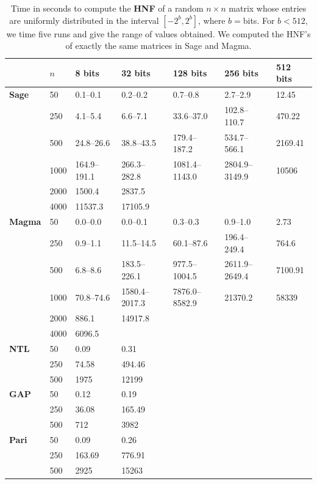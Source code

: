 \documentclass[preprint,12pt]{elsarticle}
\theoremstyle{plain}
\theoremstyle{definition}
\numberwithin{equation}{section}
\numberwithin{figure}{section}
\numberwithin{table}{section}
\begin{document}
{
\begin{table}[ht]
  \caption{Time in seconds to
    compute the {\bf HNF} of a random $n\times n$ matrix whose entries are uniformly distributed
    in the interval $[-2^b,2^b]$, where $b=$bits.
    For $b<512$, we time five runs and give the range of values obtained.  We computed the HNF's of exactly the same matrices in Sage and Magma.\label{tab1}}
 \small\begin{center}
\begin{tabular}{|l|l|l|l|l|l|l|}\hline
& $n$ & 8 bits & 32 bits  & 128 bits  & 256 bits & 512 bits\\\hline 
{\bf Sage}
& 50 & 0.1--0.1 & 0.2--0.2 & 0.7--0.8 & 2.7--2.9 & 12.45\\
& 250 & 4.1--5.4 & 6.6--7.1 & 33.6--37.0 & 102.8--110.7 & 470.22\\
& 500 & 24.8--26.6 & 38.8--43.5 & 179.4--187.2 & 534.7--566.1 & 2169.41\\
& 1000 & 164.9--191.1 & 266.3--282.8 & 1081.4--1143.0 & 2804.9--3149.9 & 10506\\
& 2000 & 1500.4 & 2837.5& & & \\
& 4000 & 11537.3 & 17105.9 & & & \\
\hline
{\bf Magma}
& 50 & 0.0--0.0 & 0.0--0.1 & 0.3--0.3 & 0.9--1.0 & 2.73\\
& 250 & 0.9--1.1 & 11.5--14.5 & 60.1--87.6 & 196.4--249.4 & 764.6\\
& 500 & 6.8--8.6 & 183.5--226.1 & 977.5--1004.5 & 2611.9--2649.4 & 7100.91\\
& 1000 & 70.8--74.6 & 1580.4--2017.3 & 7876.0--8582.9 & 21370.2 & 58339\\
& 2000 & 886.1  & 14917.8 & & & \\
& 4000 & 6096.5 &  & & & \\
\hline
{\bf NTL}
& 50 & 0.09 & 0.31 &&&\\
& 250 & 74.58 & 494.46&&&\\
& 500 & 1975 & 12199 &&&\\
\hline
{\bf GAP}
& 50 & 0.12 & 0.19  & & &\\
& 250 &  36.08 & 165.49 & && \\
& 500 & 712 & 3982  & & &\\
\hline
{\bf Pari}
& 50  & 0.09 & 0.26 & & &\\
& 250 & 163.69 & 776.91 &&& \\
& 500 & 2925 & 15263 & &&\\
\hline
\end{tabular}


\end{center}
\end{table}
}
\end{document}
